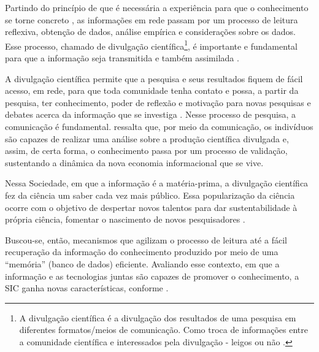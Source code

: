 \documentclass[portuguese]{textolivre}
\begin{document}
Partindo do princípio de que é necessária a experiência para que o
conhecimento se torne concreto \cite{pellicer1997}, as informações em
rede passam por um processo de leitura reflexiva, obtenção de dados,
análise empírica e considerações sobre os dados. Esse processo, chamado
de divulgação científica\footnote{A divulgação científica é a divulgação
  dos resultados de uma pesquisa em diferentes formatos/meios de
  comunicação. Como troca de informações entre a comunidade científica e
  interessados pela divulgação - leigos ou não
  \cite{garvey1979, gomes2012}.}, é importante e fundamental para que a
informação seja transmitida e também assimilada \cite{mattelart2002}.

A divulgação científica permite que a pesquisa e seus resultados fiquem
de fácil acesso, em rede, para que toda comunidade tenha contato e
possa, a partir da pesquisa, ter conhecimento, poder de reflexão e
motivação para novas pesquisas e debates acerca da informação que se
investiga \cite{garvey1979, oliveira2017}. Nesse processo de pesquisa,
a comunicação é fundamental. \textcite{gomes2012} ressalta que, por meio da
comunicação, os indivíduos são capazes de realizar uma análise sobre a
produção científica divulgada e, assim, de certa forma, o conhecimento
passa por um processo de validação, sustentando a dinâmica da nova
economia informacional que se vive.

Nessa Sociedade, em que a informação é a matéria-prima, a divulgação
científica fez da ciência um saber cada vez mais público. Essa
popularização da ciência ocorre com o objetivo de despertar novos
talentos para dar sustentabilidade à própria ciência, fomentar o
nascimento de novos pesquisadores \cite{gomes2012}.

Buscou-se, então, mecanismos que agilizam o processo de leitura até a
fácil recuperação da informação do conhecimento produzido por meio de
uma ``memória'' (banco de dados) eficiente. Avaliando esse contexto, em
que a informação e as tecnologias juntas são capazes de promover o
conhecimento, a SIC ganha novas características, conforme .
\end{document}

